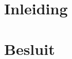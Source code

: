 \documentclass[11pt,a4paper,twoside]{article} %
\begin{document}

\tableofcontents
\vspace{1cm}





\clearpage

\section{Inleiding}




\section{Besluit}


			

	
\end{document}
